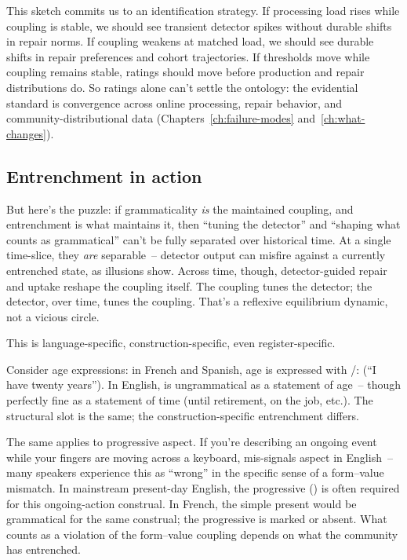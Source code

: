 This sketch commits us to an identification strategy. If processing load rises while coupling is stable, we should see transient detector spikes without durable shifts in repair norms. If coupling weakens at matched load, we should see durable shifts in repair preferences and cohort trajectories. If thresholds move while coupling remains stable, ratings should move before production and repair distributions do. So ratings alone can't settle the ontology: the evidential standard is convergence across online processing, repair behavior, and community-distributional data (Chapters~\ref{ch:failure-modes} and~\ref{ch:what-changes}).

\subsection{Entrenchment in action}
\label{sec:14:entrenchment}

But here's the puzzle: if grammaticality \emph{is} the maintained coupling, and entrenchment is what maintains it, then \enquote{tuning the detector} and \enquote{shaping what counts as grammatical} can't be fully separated over historical time. At a single time-slice, they \emph{are} separable~-- detector output can misfire against a currently entrenched state, as illusions show. Across time, though, detector-guided repair and uptake reshape the coupling itself. The coupling tunes the detector; the detector, over time, tunes the coupling. That's a reflexive equilibrium dynamic, not a vicious circle.

This is language-specific, construction-specific, even register-specific.

Consider age expressions: in French and Spanish, age is expressed with /:  (\enquote{I have twenty years}). In English, \ungram{} is ungrammatical as a statement of age~-- though perfectly fine as a statement of time (until retirement, on the job, etc.). The structural slot is the same; the construction-specific entrenchment differs. 

The same applies to progressive aspect. If you're describing an ongoing event while your fingers are moving across a keyboard,  mis-signals aspect in English~-- many speakers experience this as \enquote{wrong} in the specific sense of a form--value mismatch. In mainstream present-day English, the progressive () is often required for this ongoing-action construal. In French, the simple present would be grammatical for the same construal; the progressive is marked or absent. What counts as a violation of the form--value coupling depends on what the community has entrenched.

